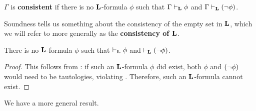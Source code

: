 \begin{boxdefinition}[Consistency]\label{Ch1:Def:Consistent}
    $\Gamma$ is \textbf{consistent} if there is no $\bL$-formula $\phi$ such that $\Gamma \vdash_{\mathbf{L}} \phi$ and $\Gamma \vdash_{\mathbf{L}} \left( \neg \phi \right)$.
\end{boxdefinition}

Soundness tells us something about the consistency of the empty set in $\bL$, which we will refer to more generally as the \textbf{consistency of $\bL$}.

\begin{boxtheorem}[Consistency of $\bL$]
    There is no $\bL$-formula $\phi$ such that $\vdash_{\mathbf{L}} \phi$ and $\vdash_{\mathbf{L}} \left( \neg \phi \right)$.
\end{boxtheorem}
\begin{proof}
    This follows from : if such an $\bL$-formula $\phi$ did exist, both $\phi$ and $\left( \neg \phi \right)$ would need to be tautologies, violating . Therefore, such an $\bL$-formula cannot exist.
\end{proof}

We have a more general result.

